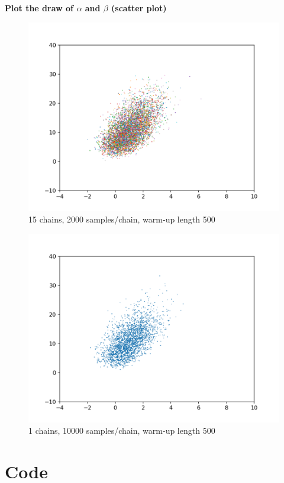 \documentclass{article}
\begin{document}
\textbf{Plot the draw of $\alpha$ and $\beta$ (scatter plot)}\\

\begin{figure}[H]
\centering  
\includegraphics[scale=0.5]{1.png}
\caption{15 chains, 2000 samples/chain, warm-up length 500 }
\label{fig: label}
\end{figure}

\begin{figure}[H]
\centering  
\includegraphics[scale=0.5]{2.png}
\caption{1 chains, 10000 samples/chain, warm-up length 500}
\label{fig: label}
\end{figure}

\clearpage
\appendix
\section{Code}
\end{document}
